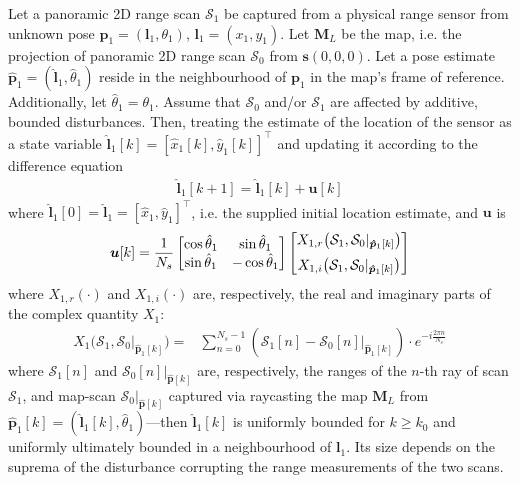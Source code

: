 \begin{theorem}
  \label{prop:theorem_without_disturbance}
  Let a panoramic 2D range scan $\mathcal{S}_1$ be captured from a physical
  range sensor from unknown pose $\bm{p}_1 = (\bm{l}_1,\theta_1)$, $\bm{l}_1 = (x_1,y_1)$.
  Let $\bm{M}_L$ be the map, i.e. the projection of panoramic 2D range scan
  $\mathcal{S}_0$ from $\bm{s}(0,0,0)$. Let a
  pose estimate $\hat{\bm{p}}_1 = (\hat{\bm{l}}_1, \hat{\theta}_1)$ reside in the
  neighbourhood of $\bm{p}_1$ in the map's frame of reference. Additionally, let
  $\hat{\theta}_1 = \theta_1$. Assume that $\mathcal{S}_0$ and/or $\mathcal{S}_1$
  are affected by additive, bounded disturbances. Then,
  treating the estimate of the location of the sensor as a state variable
  $\hat{\bm{l}}_1[k] = [\hat{x}_1[k], \hat{y}_1[k]]^\top$ and updating it according
  to the difference equation
  \begin{align}
    \hat{\bm{l}}_1[k+1] = \hat{\bm{l}}_1[k] + \bm{u}[k]
    \label{eq:difference_equation_without_disturbance}
  \end{align}
  where $\hat{\bm{l}}_1[0] = \hat{\bm{l}}_1 = [\hat{x}_1, \hat{y}_1]^{\top}$,
  i.e. the supplied initial location estimate, and $\bm{u}$ is
  \begin{align}
    \bm{u}[k] = \dfrac{1}{N_s}
    \begin{bmatrix}
      \cos\hat{\theta}_1 & \sin\hat{\theta}_1 \\
      \sin\hat{\theta}_1 & - \cos\hat{\theta}_1
    \end{bmatrix}
    \begin{bmatrix}
      X_{1,r}\big(\mathcal{S}_1, \mathcal{S}_0|_{\bm{\hat{p}}_1[k]}\big) \vspace{0.2cm} \\
      X_{1,i}\big(\mathcal{S}_1, \mathcal{S}_0|_{\bm{\hat{p}}_1[k]}\big)
    \end{bmatrix}
    \label{eq:control_vector_without_disturbance}
  \end{align}
  where $X_{1,r}(\cdot)$ and $X_{1,i}(\cdot)$ are, respectively, the real and
  imaginary parts of the complex quantity $X_1$:
  \begin{align}
    X_1\big(\mathcal{S}_1, \mathcal{S}_0|_{\bm{\hat{p}}_1[k]}\big)
      = &\sum\limits_{n=0}^{N_s-1}(\mathcal{S}_1[n] - \mathcal{S}_0[n]|_{\bm{\hat{p}}_1[k]}) \cdot e^{-i \frac{2 \pi n}{N_s}} \label{eq:X1}
  \end{align}
  where $\mathcal{S}_1[n]$ and $\mathcal{S}_0[n]|_{\bm{\hat{p}}[k]}$ are,
  respectively, the ranges of the $n$-th ray of scan $\mathcal{S}_1$, and
  map-scan $\mathcal{S}_0|_{\bm{\hat{p}}[k]}$ captured via raycasting the map
  $\bm{M}_L$ from $\bm{\hat{p}}_1[k] = (\hat{\bm{l}}_1[k],
  \hat{\theta}_1)$---then $\hat{\bm{l}}_1[k]$ is uniformly bounded for $k \geq
  k_0$ and uniformly ultimately bounded in a neighbourhood of $\bm{l}_1$. Its
  size depends on the suprema of the disturbance corrupting the range
  measurements of the two scans.
\end{theorem}



